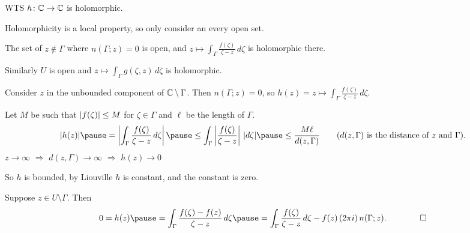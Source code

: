 \documentclass[10pt,aspectratio=169]{beamer}
\begin{document}
\begin{frame}
WTS $h \colon {\mathbb{C}} \to {\mathbb{C}}$ is holomorphic.

\medskip
\pause

Holomorphicity is a local property, so only consider an every open set.

\medskip
\pause

The set of $z \notin \Gamma$ where $n(\Gamma;z) = 0$ is open, and 
$\displaystyle z \mapsto \int_\Gamma \frac{f(\zeta)}{\zeta-z} \, d\zeta$ is
holomorphic there.

\medskip
\pause

Similarly $U$ is open and $\displaystyle
z \mapsto
\int_\Gamma g(\zeta,z) \, d\zeta$ is holomorphic.

\medskip
\pause

Consider $z$ in the unbounded component of
${\mathbb{C}} \setminus \Gamma$.
\pause
Then $n(\Gamma;z) = 0$, so
$h(z) = 
z \mapsto \int_\Gamma \frac{f(\zeta)}{\zeta-z} \, d\zeta$.

\medskip
\pause

Let $M$ be such that
$\lvert {f(\zeta)} \rvert \leq M$ for $\zeta \in \Gamma$ and
\pause
$\ell$ be the length of
$\Gamma$.
\pause
\[
\sabs{h(z)}
\pause
=
\abs{
\int_\Gamma \frac{f(\zeta)}{\zeta-z} \, d\zeta
}
\pause
\leq
\int_\Gamma \abs{\frac{f(\zeta)}{\zeta-z}} \, \sabs{d\zeta}
\pause
\leq
\frac{M \ell}{d(z,\Gamma)}
\qquad \text{($d(z,\Gamma)$ is the distance of $z$ and $\Gamma$).}
\]
\pause
$z \to \infty$ \quad $\Rightarrow$ \quad $d(z,\Gamma) \to \infty$ \quad
$\Rightarrow$ \quad $h(z) \to 0$

\medskip
\pause

So $h$ is bounded, by Liouville $h$ is constant, and the constant is zero.

\medskip
\pause

Suppose $z \in U \setminus \Gamma$.  Then
\[
0 = h(z)
\pause
=
\int_\Gamma \frac{f(\zeta)-f(z)}{\zeta-z} \, d\zeta
\pause
=
\int_\Gamma \frac{f(\zeta)}{\zeta-z} \, d\zeta
-
f(z) \, (2\pi i) \, n(\Gamma;z) . \qquad \qed
\]

\end{frame}
\end{document}

